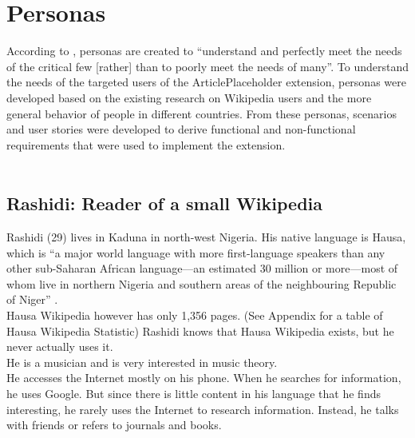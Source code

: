 \chapter{Personas}

According to \citet[182]{design:01}, personas are created to ``understand and perfectly meet the needs of the critical few [rather] than to poorly meet the needs of many''. To understand the needs of the targeted users of the ArticlePlaceholder extension, personas were developed based on the existing research on Wikipedia users \citep{wiki:37} and the more general behavior of people in different countries. From these personas, scenarios and user stories were developed to derive functional and non-functional requirements that were used to implement the extension. \\
\\
\section{Rashidi: Reader of a small Wikipedia}
Rashidi (29) lives in Kaduna in north-west Nigeria. His native language is Hausa, which is ``a major world language with more first-language speakers than any other sub-Saharan African language---an estimated 30 million or more---most of whom live in northern Nigeria and southern areas of the neighbouring Republic of Niger'' \cite[p1]{hausa}. \\
Hausa Wikipedia however has only 1,356 pages. (See Appendix for a table of Hausa Wikipedia Statistic) Rashidi knows that Hausa Wikipedia exists, but he never actually uses it. \\
He is a musician and is very interested in music theory. \\
He accesses the Internet mostly on his phone. When he searches for information, he uses Google. But since there is little content in his language that he finds interesting, he rarely uses the Internet to research information. Instead, he talks with friends or refers to journals and books.


